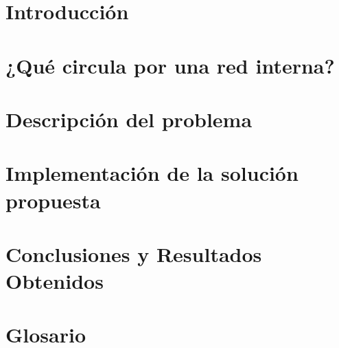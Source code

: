 \documentclass[12pt,twoside]{book}
\begin{document}
\nocite{*}

\frontmatter\pagestyle{empty}

\begin{titlepage}

\end{titlepage}

\begin{titlepage}

\end{titlepage}



\setcounter{page}{1}



\tableofcontents


\mainmatter\pagestyle{headings}


\chapter{Introducci\'on} \setcounter{page}{1}
    \label{capIntro}





\chapter{¿Qué circula por una red interna?} \setcounter{page}{1}
    \label{capImp}


\chapter{Descripci\'on del problema} \setcounter{page}{1}
    \label{capDesc}


\chapter{Implementaci\'on de la soluci\'on propuesta} \setcounter{page}{1}
    \label{capImp}







\chapter{Conclusiones y Resultados Obtenidos}
    \label{capConc}




\appendix
\chapter{Glosario}





%
\end{document}
